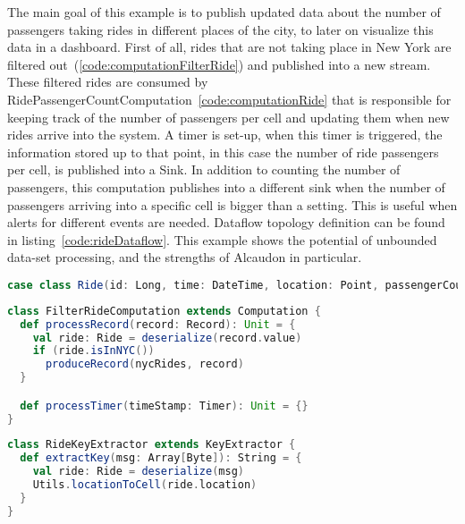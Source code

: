 The main goal of this example is to publish updated data about the number of
passengers taking rides in different places of the city, to later on visualize
this data in a dashboard. First of all, rides that are not taking place in New
York are filtered out~(\ref{code:computationFilterRide}) and published into a new
stream. These filtered rides are consumed by
RidePassengerCountComputation~\ref{code:computationRide} that is responsible
for keeping track of the number of passengers per cell and updating them when new rides
arrive into the system. A timer is set-up, when this timer is triggered, the
information stored up to that point, in this case the number of ride passengers
per cell, is published into a Sink. In addition to counting the number of
passengers, this computation publishes into a different sink when the number of
passengers arriving into a specific cell is bigger than a setting. This is
useful when alerts for different events are needed. Dataflow topology definition
can be found in listing~\ref{code:rideDataflow}. This example shows the
potential of unbounded data-set processing, and the strengths of Alcaudon in
particular.

\begin{lstlisting}[language=scala, frame=trBL, label=code:ride, float=ht, caption = {Ride \acs{ADT}}]
case class Ride(id: Long, time: DateTime, location: Point, passengerCount: Int)
\end{lstlisting}

\begin{lstlisting}[language=scala, frame=trBL, label=code:computationFilterRide, float=ht, caption = {Computation to filter out non New York rides}]
class FilterRideComputation extends Computation {
  def processRecord(record: Record): Unit = {
    val ride: Ride = deserialize(record.value)
    if (ride.isInNYC())
      produceRecord(nycRides, record)
  }

  def processTimer(timeStamp: Timer): Unit = {}
}
\end{lstlisting}

\begin{lstlisting}[language=scala, frame=trBL, label=code:keyExtractorNY, float=ht, caption = {Key extractor function}]
class RideKeyExtractor extends KeyExtractor {
  def extractKey(msg: Array[Byte]): String = {
    val ride: Ride = deserialize(msg)
    Utils.locationToCell(ride.location)
  }
}
\end{lstlisting}

